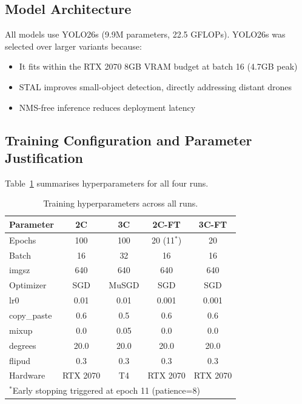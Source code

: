\documentclass[11pt]{article}
\begin{document}
\subsection{Model Architecture}

All models use YOLO26s (9.9M parameters, 22.5 GFLOPs). YOLO26s was selected
over larger variants because:
\begin{itemize}
  \item It fits within the RTX 2070 8GB VRAM budget at batch 16 (4.7GB peak)
  \item STAL improves small-object detection, directly addressing distant drones
  \item NMS-free inference reduces deployment latency
\end{itemize}

\subsection{Training Configuration and Parameter Justification}

Table~\ref{tab:params} summarises hyperparameters for all four runs.

\begin{table}[H]
\centering
\caption{Training hyperparameters across all runs.}
\label{tab:params}
\begin{tabular}{lcccc}
\toprule
\textbf{Parameter} & \textbf{2C} & \textbf{3C} & \textbf{2C-FT} & \textbf{3C-FT} \\
\midrule
Epochs       & 100   & 100   & 20 (11$^*$) & 20 \\
Batch        & 16    & 32    & 16    & 16 \\
imgsz        & 640   & 640   & 640   & 640 \\
Optimizer    & SGD   & MuSGD & SGD   & SGD \\
lr0          & 0.01  & 0.01  & 0.001 & 0.001 \\
copy\_paste  & 0.6   & 0.5   & 0.6   & 0.6 \\
mixup        & 0.0   & 0.05  & 0.0   & 0.0 \\
degrees      & 20.0  & 20.0  & 20.0  & 20.0 \\
flipud       & 0.3   & 0.3   & 0.3   & 0.3 \\
Hardware     & RTX 2070 & T4 & RTX 2070 & RTX 2070 \\
\bottomrule
\multicolumn{5}{l}{\small $^*$Early stopping triggered at epoch 11 (patience=8)}
\end{tabular}
\end{table}
\end{document}
